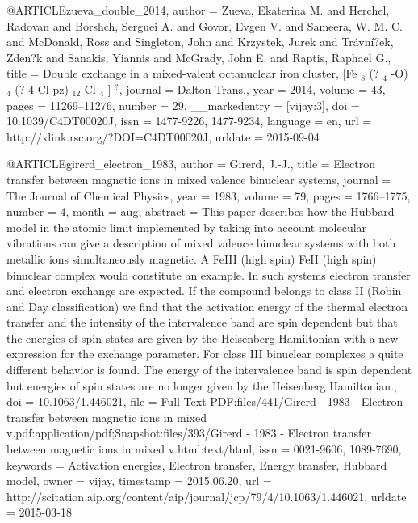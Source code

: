 @ARTICLE{zueva_double_2014,
  author = {Zueva, Ekaterina M. and Herchel, Radovan and Borshch, Serguei A.
	and Govor, Evgen V. and Sameera, W. M. C. and McDonald, Ross and
	Singleton, John and Krzystek, Jurek and Trávní?ek, Zden?k and Sanakis,
	Yiannis and McGrady, John E. and Raptis, Raphael G.},
  title = {Double exchange in a mixed-valent octanuclear iron cluster, [{Fe}
	$_{\textrm{8}}$ (? $_{\textrm{4}}$ -{O}) $_{\textrm{4}}$ (?-4-{Cl}-pz)
	$_{\textrm{12}}$ {Cl} $_{\textrm{4}}$ ] $^{\textrm{?}}$},
  journal = {Dalton Trans.},
  year = {2014},
  volume = {43},
  pages = {11269--11276},
  number = {29},
  __markedentry = {[vijay:3]},
  doi = {10.1039/C4DT00020J},
  issn = {1477-9226, 1477-9234},
  language = {en},
  url = {http://xlink.rsc.org/?DOI=C4DT00020J},
  urldate = {2015-09-04}
}

@ARTICLE{girerd_electron_1983,
  author = {Girerd, J.-J.},
  title = {Electron transfer between magnetic ions in mixed valence binuclear
	systems},
  journal = {The Journal of Chemical Physics},
  year = {1983},
  volume = {79},
  pages = {1766--1775},
  number = {4},
  month = aug,
  abstract = {This paper describes how the Hubbard model in the atomic limit implemented
	by taking into account molecular vibrations can give a description
	of mixed valence binuclear systems with both metallic ions simultaneously
	magnetic. A FeIII (high spin) FeII (high spin) binuclear complex
	would constitute an example. In such systems electron transfer and
	electron exchange are expected. If the compound belongs to class
	II (Robin and Day classification) we find that the activation energy
	of the thermal electron transfer and the intensity of the intervalence
	band are spin dependent but that the energies of spin states are
	given by the Heisenberg Hamiltonian with a new expression for the
	exchange parameter. For class III binuclear complexes a quite different
	behavior is found. The energy of the intervalence band is spin dependent
	but energies of spin states are no longer given by the Heisenberg
	Hamiltonian.},
  doi = {10.1063/1.446021},
  file = {Full Text PDF:files/441/Girerd - 1983 - Electron transfer between magnetic ions in mixed v.pdf:application/pdf;Snapshot:files/393/Girerd - 1983 - Electron transfer between magnetic ions in mixed v.html:text/html},
  issn = {0021-9606, 1089-7690},
  keywords = {Activation energies, Electron transfer, Energy transfer, Hubbard model},
  owner = {vijay},
  timestamp = {2015.06.20},
  url = {http://scitation.aip.org/content/aip/journal/jcp/79/4/10.1063/1.446021},
  urldate = {2015-03-18}
}

